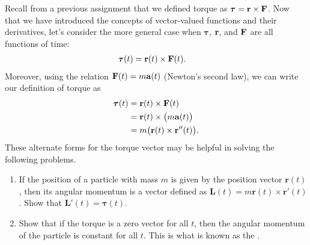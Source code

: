 Recall from a previous assignment that we defined torque as $\boldsymbol\tau = \mathbf{r} \times \mathbf{F}$. Now that we have introduced the concepts of vector-valued functions and their derivatives, let's consider the more general case when $\boldsymbol\tau$, $\mathbf{r}$, and $\mathbf{F}$ are all functions of time:
\begin{align*}
  \boldsymbol\tau(t) &= \mathbf{r}(t) \times \mathbf{F}(t).
\end{align*}
Moreover, using the relation $\mathbf{F}(t)=m\mathbf{a}(t)$ (Newton's second law), we can write our definition of torque as
\begin{align*}
  \boldsymbol\tau(t) &= \mathbf{r}(t) \times \mathbf{F}(t) \\
  &= \mathbf{r}(t) \times \big(m\mathbf{a}(t)\big) \\
  &= m\big( \mathbf{r}(t) \times \mathbf{r}''(t)\big).
\end{align*}
These alternate forms for the torque vector may be helpful in solving the following problems.
\begin{enumerate}
\item If the position of a particle with mass $m$ is given by the position vector $\mathbf{r}(t)$, then its angular momentum is a vector defined as $\mathbf{L}(t) = m\mathbf{r}(t)\times \mathbf{r}'(t)$. Show that $\mathbf{L}'(t) = \boldsymbol\tau(t)$.
\item Show that if the torque is a zero vector for all $t$, then the angular momentum of the particle is constant for all $t$. This is what is known as the .
\end{enumerate}
%
%
